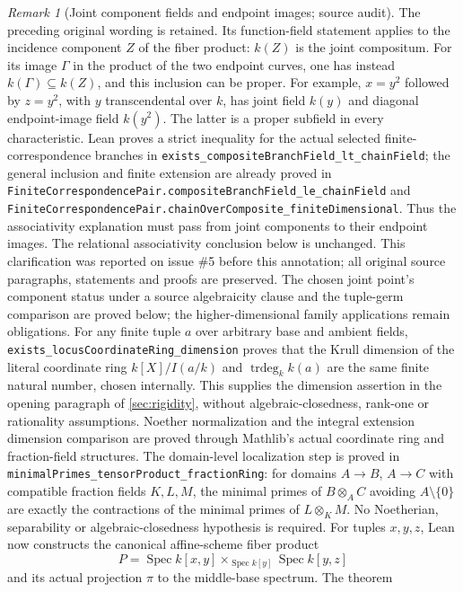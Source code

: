 \documentclass[11pt,oneside]{article}
\theoremstyle{definition}
\theoremstyle{remark}
\newtheorem{remark}[theorem]{Remark}
\newcommand{\trdeg}{\operatorname{trdeg}}
\newcommand{\lean}[1]{\nolinkurl{#1}}
\begin{document}
\begin{remark}[Joint component fields and endpoint images; source audit]
The preceding original wording is retained. Its function-field statement applies to
the incidence component $Z$ of the fiber product: $k(Z)$ is the joint compositum.
For its image $\Gamma$ in the product of the two endpoint curves, one has instead
$k(\Gamma)\subseteq k(Z)$, and this inclusion can be proper. For example,
$x=y^2$ followed by $z=y^2$, with $y$ transcendental over $k$, has joint field
$k(y)$ and diagonal endpoint-image field $k(y^2)$. The latter is a proper subfield
in every characteristic. Lean proves a strict inequality for the actual selected
finite-correspondence branches in
\lean{exists_compositeBranchField_lt_chainField}; the general inclusion and finite
extension are already proved in
\lean{FiniteCorrespondencePair.compositeBranchField_le_chainField} and
\lean{FiniteCorrespondencePair.chainOverComposite_finiteDimensional}.
Thus the associativity explanation must pass from joint components to their endpoint
images. The relational associativity conclusion below is unchanged. This clarification
was reported on issue \#5 before this annotation; all original source paragraphs,
statements and proofs are preserved. The chosen joint point's component status under
a source algebraicity clause and the tuple-germ comparison are proved below;
the higher-dimensional family applications remain obligations.
For any finite tuple $a$ over arbitrary base and ambient fields,
\lean{exists_locusCoordinateRing_dimension} proves that the Krull dimension
of the literal coordinate ring $k[X]/I(a/k)$ and $\trdeg_k k(a)$ are the
same finite natural number, chosen internally. This supplies the dimension
assertion in the opening paragraph of \cref{sec:rigidity}, without
algebraic-closedness, rank-one or rationality assumptions. Noether normalization and the integral
extension dimension comparison are proved through Mathlib's actual coordinate
ring and fraction-field structures.
The domain-level localization step is proved in
\lean{minimalPrimes_tensorProduct_fractionRing}: for domains $A\to B$, $A\to C$
with compatible fraction fields $K,L,M$, the minimal primes of $B\otimes_A C$
avoiding $A\setminus\{0\}$ are exactly the contractions of the minimal primes
of $L\otimes_K M$. No Noetherian, separability or algebraic-closedness hypothesis
is required. For tuples $x,y,z$, Lean now constructs the canonical affine-scheme
fiber product
\[
 P=\operatorname{Spec} k[x,y]\times_{\operatorname{Spec} k[y]}
   \operatorname{Spec} k[y,z]
\]
and its actual projection $\pi$ to the middle-base spectrum. The theorem

\end{remark}
\end{document}
